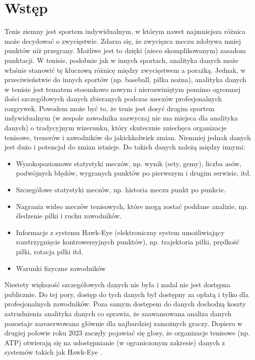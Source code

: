 \documentclass[12pt, a4paper]{article}
\begin{document}
\section{Wstęp}
Tenis ziemny jest sportem indywidualnym, w którym nawet najmniejsza różnica może decydować o zwycięstwie. Zdarza się, że zwycięzca meczu zdobywa mniej punktów niż przegrany. Możliwe jest to dzięki (nieco skomplikowanym) zasadom punktacji. W tenisie, podobnie jak w innych sportach, analityka danych może właśnie stanowić tę kluczową różnicę między zwycięstwem a porażką. Jednak, w przeciwieństwie do innych sportów (np. baseball, piłka nożna), analityka danych w tenisie jest tematem stosunkowo nowym i nierozwiniętym pomimo ogromnej ilości szczegółowych danych zbieranych podczas meczów profesjonalnych rozgrywek. Powodem może być to, że tenis jest dosyć drogim sportem indywidualnym (w zespole zawodnika zazwyczaj nie ma miejsca dla analityka danych) o tradycyjnym wizerunku, który skutecznie zniechęca organizacje tenisowe, trenerów i zawodników do jakichkolwiek zmian. Niemniej jednak danych jest dużo i potencjał do zmian istnieje. Do takich danych należą między innymi:
\begin{itemize}
    \item Wysokopoziomowe statystyki meczów, np. wynik (sety, gemy), liczba asów, podwójnych błędów, wygranych punktów po pierwszym i drugim serwisie, itd.
    \item Szczegółowe statystyki meczów, np. historia meczu punkt po punkcie.
    \item Nagrania wideo meczów tenisowych, które mogą zostać poddane analizie, np. śledzenie piłki i ruchu zawodników.
    \item Informacje z systemu Hawk-Eye (elektroniczny system umożliwiający rozstrzygnięcie kontrowersyjnych punktów), np. trajektoria piłki, prędkość piłki, rotacja piłki itd.
    \item Warunki fizyczne zawodników
\end{itemize}
Niestety większość szczegółowych danych nie była i nadal nie jest dostępna publicznie. Do tej pory, dostęp do tych danych był dostępny za opłatą i tylko dla profesjonalnych zawodników. Poza samym dostępem do danych dochodzą koszty zatrudnienia analityka danych co sprawia, że zaawansowana analiza danych pozostaje zarezerwowana głównie dla najbardziej zamożnych graczy. Dopiero w drugiej połowie roku 2023 zaczęły pojawiać się głosy, że organizacje tenisowe (np. ATP) otwierają się na udostępnianie (w ograniczonym zakresie) danych z systemów takich jak Hawk-Eye \cite{the_telegraph}.
\end{document}
